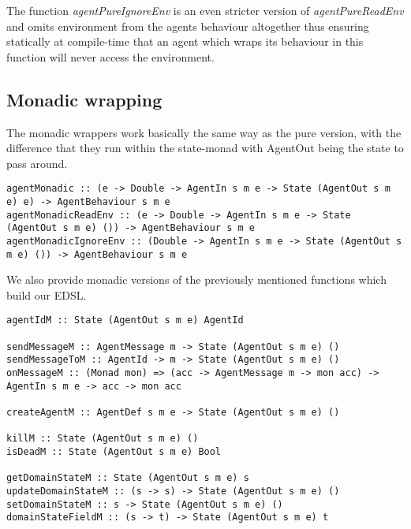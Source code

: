 The function \textit{agentPureIgnoreEnv} is an even stricter version of \textit{agentPureReadEnv} and omits environment from the agents behaviour altogether thus ensuring statically at compile-time  that an agent which wraps its behaviour in this function will never access the environment.

\subsection{Monadic wrapping}
The monadic wrappers work basically the same way as the pure version, with the difference that they run within the state-monad with AgentOut being the state to pass around.

\begin{verbatim}
agentMonadic :: (e -> Double -> AgentIn s m e -> State (AgentOut s m e) e) -> AgentBehaviour s m e
agentMonadicReadEnv :: (e -> Double -> AgentIn s m e -> State (AgentOut s m e) ()) -> AgentBehaviour s m e
agentMonadicIgnoreEnv :: (Double -> AgentIn s m e -> State (AgentOut s m e) ()) -> AgentBehaviour s m e
\end{verbatim}

We also provide monadic versions of the previously mentioned functions which build our EDSL.

\begin{verbatim}
agentIdM :: State (AgentOut s m e) AgentId

sendMessageM :: AgentMessage m -> State (AgentOut s m e) ()
sendMessageToM :: AgentId -> m -> State (AgentOut s m e) ()
onMessageM :: (Monad mon) => (acc -> AgentMessage m -> mon acc) -> AgentIn s m e -> acc -> mon acc

createAgentM :: AgentDef s m e -> State (AgentOut s m e) ()

killM :: State (AgentOut s m e) ()
isDeadM :: State (AgentOut s m e) Bool

getDomainStateM :: State (AgentOut s m e) s
updateDomainStateM :: (s -> s) -> State (AgentOut s m e) ()
setDomainStateM :: s -> State (AgentOut s m e) ()
domainStateFieldM :: (s -> t) -> State (AgentOut s m e) t
\end{verbatim}

